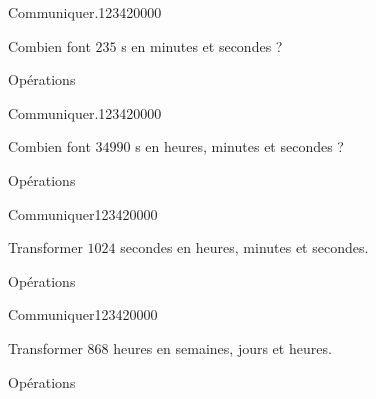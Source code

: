 \begin{pageAD}


\begin{ExoCad}{Communiquer.}{1234}{2}{0}{0}{0}{0} 
 

\begin{minipage}{0.58\linewidth}
Combien font $235$ s en minutes et secondes ? 
 
\end{minipage}
\hfill
\vrule
\hfill
\begin{minipage}{0.38\linewidth}
Opérations
\vspace{2.5cm}
\end{minipage}

\end{ExoCad}
 
\begin{ExoCad}{Communiquer.}{1234}{2}{0}{0}{0}{0}
 

\begin{minipage}{0.58\linewidth}
Combien font $34 990$ s en heures, minutes et secondes ? 
 
\end{minipage}
\hfill
\vrule
\hfill
\begin{minipage}{0.38\linewidth}
Opérations
\vspace{2.5cm}
\end{minipage}

\end{ExoCad}

 
\begin{ExoCad}{Communiquer}{1234}{2}{0}{0}{0}{0}

\begin{minipage}{0.58\linewidth}
Transformer $1024$ secondes en heures, minutes et secondes. 
 
\end{minipage}
\hfill
\vrule
\hfill
\begin{minipage}{0.38\linewidth}
Opérations
\vspace{2.5cm}
\end{minipage}

\end{ExoCad}

\begin{ExoCad}{Communiquer}{1234}{2}{0}{0}{0}{0}

\begin{minipage}{0.58\linewidth}
Transformer 868 heures en semaines, jours et heures. 
 
\end{minipage}
\hfill
\vrule
\hfill
\begin{minipage}{0.38\linewidth}
Opérations
\vspace{2.5cm}
\end{minipage}


\end{ExoCad}


\end{pageAD}


